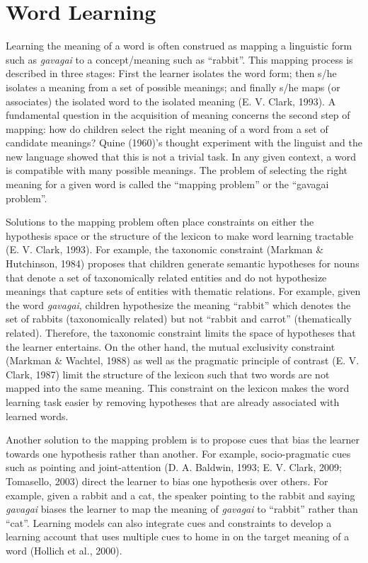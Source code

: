 \documentclass[oneside]{report}
\theoremstyle{definition}
\theoremstyle{definition}
\theoremstyle{definition}
\theoremstyle{remark}
\begin{document}
\section{Word Learning}\label{word-learning}

Learning the meaning of a word is often construed as mapping a
linguistic form such as \emph{gavagai} to a concept/meaning such as
``rabbit''. This mapping process is described in three stages: First the
learner isolates the word form; then s/he isolates a meaning from a set
of possible meanings; and finally s/he maps (or associates) the isolated
word to the isolated meaning (E. V. Clark, 1993). A fundamental question
in the acquisition of meaning concerns the second step of mapping: how
do children select the right meaning of a word from a set of candidate
meanings? Quine (1960)'s thought experiment with the linguist and the
new language showed that this is not a trivial task. In any given
context, a word is compatible with many possible meanings. The problem
of selecting the right meaning for a given word is called the ``mapping
problem'' or the ``gavagai problem''.

Solutions to the mapping problem often place constraints on either the
hypothesis space or the structure of the lexicon to make word learning
tractable (E. V. Clark, 1993). For example, the taxonomic constraint
(Markman \& Hutchinson, 1984) proposes that children generate semantic
hypotheses for nouns that denote a set of taxonomically related entities
and do not hypothesize meanings that capture sets of entities with
thematic relations. For example, given the word \emph{gavagai}, children
hypothesize the meaning ``rabbit'' which denotes the set of rabbits
(taxonomically related) but not ``rabbit and carrot'' (thematically
related). Therefore, the taxonomic constraint limits the space of
hypotheses that the learner entertains. On the other hand, the mutual
exclusivity constraint (Markman \& Wachtel, 1988) as well as the
pragmatic principle of contrast (E. V. Clark, 1987) limit the structure
of the lexicon such that two words are not mapped into the same meaning.
This constraint on the lexicon makes the word learning task easier by
removing hypotheses that are already associated with learned words.

Another solution to the mapping problem is to propose cues that bias the
learner towards one hypothesis rather than another. For example,
socio-pragmatic cues such as pointing and joint-attention (D. A.
Baldwin, 1993; E. V. Clark, 2009; Tomasello, 2003) direct the learner to
bias one hypothesis over others. For example, given a rabbit and a cat,
the speaker pointing to the rabbit and saying \emph{gavagai} biases the
learner to map the meaning of \emph{gavagai} to ``rabbit'' rather than
``cat''. Learning models can also integrate cues and constraints to
develop a learning account that uses multiple cues to home in on the
target meaning of a word (Hollich et al., 2000).
\end{document}
